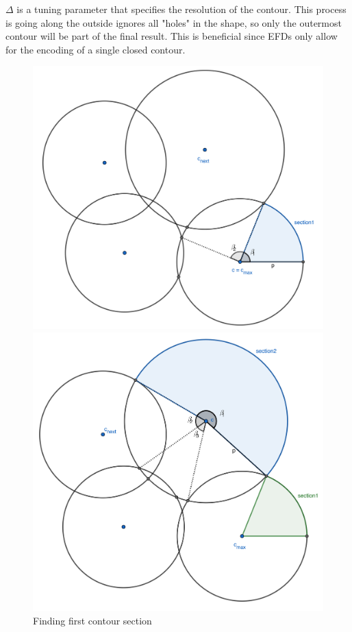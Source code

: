 $\Delta$ is a tuning parameter that specifies the resolution of the contour.
This process is going along the outside ignores all "holes" in the shape, so only the outermost contour will be part of the final result. 
This is beneficial since EFDs only allow for the encoding of a single closed contour.

\begin{figure}[H]
    \includegraphics[width=1.0\textwidth]{figures/contour/c1copy.pdf}
    \caption{Finding first contour section}
  \endminipage\hfill
    \includegraphics[width=1.0\textwidth]{figures/contour/c2copy.pdf}

\end{figure}
